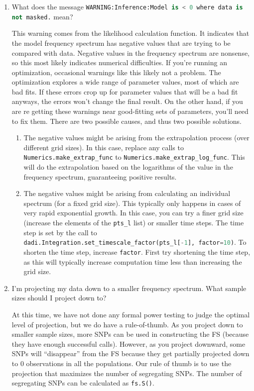 \documentclass[12pt]{article}
\makeatletter
\newcommand{\py}[1]{\lstinline[language=Python, showstringspaces=False]@#1@}
\makeatother
\begin{document}
\begin{enumerate}
\item What does the message \py{WARNING:Inference:Model is < 0 where data is not masked.} mean?

This warning comes from the likelihood calculation function.
It indicates that the model frequency spectrum has negative values that are trying to be compared with data.
Negative values in the frequency spectrum are nonsense, so this most likely indicates numerical difficulties.
If you're running an optimization, occasional warnings like this likely not a problem.
The optimization explores a wide range of parameter values, most of which are bad fits.
If these errors crop up for parameter values that will be a bad fit anyways, the errors won't change the final result.
On the other hand, if you are re getting these warnings near good-fitting sets of parameters, you'll need to fix them.
There are two possible causes, and thus two possible solutions.

\begin{enumerate}
\item The negative values might be arising from the extrapolation process (over different grid sizes).
In this case, replace any calls to \py{Numerics.make_extrap_func} to \py{Numerics.make_extrap_log_func}.
This will do the extrapolation based on the logarithms of the value in the frequency spectrum, guaranteeing positive results.

\item The negative values might be arising from calculating an individual spectrum (for a fixed grid size).
This typically only happens in cases of very rapid exponential growth.
In this case, you can try a finer grid size (increase the elements of the \py{pts_l} list) or smaller time steps.
The time step is set by the call to \py{dadi.Integration.set_timescale_factor(pts_l[-1], factor=10)}.
To shorten the time step, increase \py{factor}.
First try shortening the time step, as this will typically increase computation time less than increasing the grid size.
\end{enumerate}

\item I'm projecting my data down to a smaller frequency spectrum. What sample sizes should I project down to?

At this time, we have not done any formal power testing to judge the optimal level of projection, but we do have a rule-of-thumb.
As you project down to smaller sample sizes, more SNPs can be used in constructing the FS (because they have
enough successful calls).
However, as you project downward, some SNPs will ``disappear'' from the FS because they get partially projected down
to 0 observations in all the populations.
Our rule of thumb is to use the projection that maximizes the number of segregating SNPs.
The number of segregating SNPs can be calculated as \py{fs.S()}.

\end{enumerate}


\end{document}
